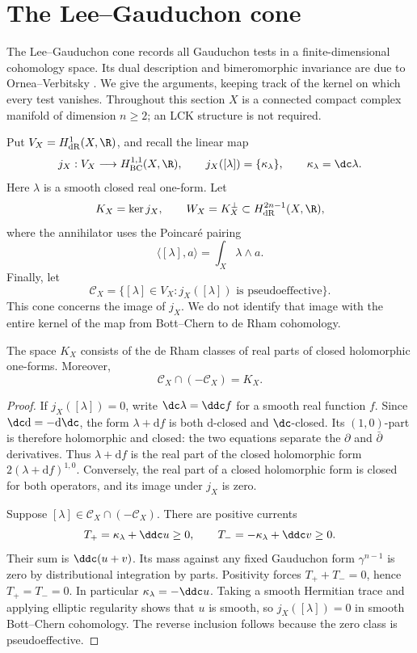 \section{The Lee--Gauduchon cone}
\label{sec:lee-gauduchon-cone}

The Lee--Gauduchon cone records all Gauduchon tests in a finite-dimensional cohomology space. Its dual description and bimeromorphic invariance are due to Ornea--Verbitsky \cite[Theorems 3.11 and 4.5]{OV25LeeGauduchon}. We give the arguments, keeping track of the kernel on which every test vanishes. Throughout this section $X$ is a connected compact complex manifold of dimension $n\geq2$; an LCK structure is not required.

Put $V_X=H^1_{\mathrm{dR}}(X,\R)$, and recall the linear map
\[
 j_X:V_X\longrightarrow H^{1,1}_{\mathrm{BC}}(X,\R),
 \qquad j_X([\lambda])=\{\kappa_\lambda\},
 \qquad \kappa_\lambda=\dc\lambda.
\]
Here $\lambda$ is a smooth closed real one-form. Let
\[
 K_X=\ker j_X,\qquad
 W_X=K_X^\perp\subset H^{2n-1}_{\mathrm{dR}}(X,\R),
\]
where the annihilator uses the Poincar\'e pairing
\[
 \langle[\lambda],a\rangle=\int_X\lambda\wedge a.
\]
Finally, let
\[
 \mathcal C_X
 =\{[\lambda]\in V_X:j_X([\lambda])\text{ is pseudoeffective}\}.
\]
This cone concerns the image of $j_X$. We do not identify that image with the entire kernel of the map from Bott--Chern to de Rham cohomology.

\begin{lemma}\label{lem:lee-gauduchon-kernel}
The space $K_X$ consists of the de Rham classes of real parts of closed holomorphic one-forms. Moreover,
\[
 \mathcal C_X\cap(-\mathcal C_X)=K_X.
\]
\end{lemma}
\begin{proof}
If $j_X([\lambda])=0$, write $\dc\lambda=\ddc f$ for a smooth real function $f$. Since $\dc\mathrm{d}=-\mathrm{d}\dc$, the form $\lambda+\mathrm{d}f$ is both $\mathrm{d}$-closed and $\dc$-closed. Its $(1,0)$-part is therefore holomorphic and closed: the two equations separate the $\partial$ and $\bar\partial$ derivatives. Thus $\lambda+\mathrm{d}f$ is the real part of the closed holomorphic form $2(\lambda+\mathrm{d}f)^{1,0}$. Conversely, the real part of a closed holomorphic form is closed for both operators, and its image under $j_X$ is zero.

Suppose $[\lambda]\in\mathcal C_X\cap(-\mathcal C_X)$. There are positive currents
\[
 T_+=\kappa_\lambda+\ddc u\geq0,
 \qquad T_-=-\kappa_\lambda+\ddc v\geq0.
\]
Their sum is $\ddc(u+v)$. Its mass against any fixed Gauduchon form $\gamma^{n-1}$ is zero by distributional integration by parts. Positivity forces $T_++T_-=0$, hence $T_+=T_-=0$. In particular $\kappa_\lambda=-\ddc u$. Taking a smooth Hermitian trace and applying elliptic regularity shows that $u$ is smooth, so $j_X([\lambda])=0$ in smooth Bott--Chern cohomology. The reverse inclusion follows because the zero class is pseudoeffective.
\end{proof}

